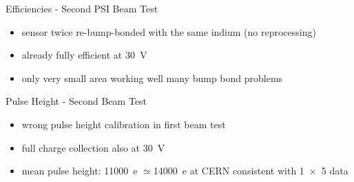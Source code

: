 \begin{frame}{Efficiencies - Second PSI Beam Test}

	
	\begin{itemize}\itemfill
		\item sensor twice re-bump-bonded with the same indium (no reprocessing)
		\item already fully efficient at \SI{30}{\volt}
		\item only very small area working well \ra many bump bond problems
	\end{itemize}
	
\end{frame}
\begin{frame}{Pulse Height - Second Beam Test}

	
	\begin{itemize}\itemfill
		\item wrong pulse height calibration in first beam test
		\item full charge collection also at \SI{30}{\volt}
		\item mean pulse height: \SI{11000}{e} \ra $\simeq$\SI{14000}{e} at CERN \ra consistent with \SI{1x5}{} data
	\end{itemize}
	
\end{frame}
